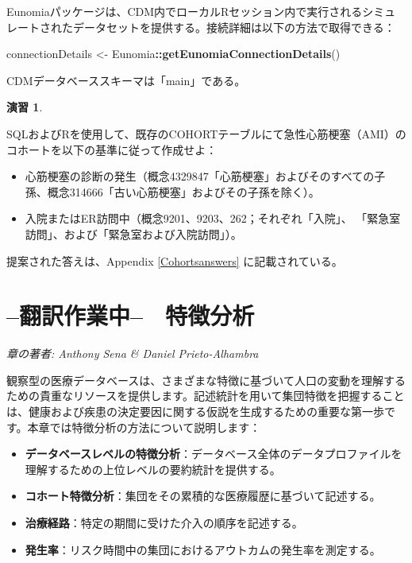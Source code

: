 \documentclass[
  11pt]{book}
\newenvironment{Shaded}{\begin{snugshade}}{\end{snugshade}}
\newcommand{\FunctionTok}[1]{\textcolor[rgb]{0.13,0.29,0.53}{\textbf{#1}}}
\newcommand{\NormalTok}[1]{#1}
\newcommand{\OtherTok}[1]{\textcolor[rgb]{0.56,0.35,0.01}{#1}}
\newcommand{\SpecialCharTok}[1]{\textcolor[rgb]{0.81,0.36,0.00}{\textbf{#1}}}
\providecommand{\tightlist}{%
  \setlength{\itemsep}{0pt}\setlength{\parskip}{0pt}}
\theoremstyle{definition}
\theoremstyle{definition}
\theoremstyle{definition}
\newtheorem{exercise}{演習}[chapter]
\theoremstyle{definition}
\theoremstyle{remark}
\begin{document}
Eunomiaパッケージは、CDM内でローカルRセッション内で実行されるシミュレートされたデータセットを提供する。接続詳細は以下の方法で取得できる：

\begin{Shaded}
\begin{Highlighting}[]
\NormalTok{connectionDetails }\OtherTok{\textless{}{-}}\NormalTok{ Eunomia}\SpecialCharTok{::}\FunctionTok{getEunomiaConnectionDetails}\NormalTok{()}
\end{Highlighting}
\end{Shaded}

CDMデータベーススキーマは「main」である。

\begin{exercise}
\protect\hypertarget{exr:exerciseCohortsSql}{}\label{exr:exerciseCohortsSql}

SQLおよびRを使用して、既存のCOHORTテーブルにて急性心筋梗塞（AMI）のコホートを以下の基準に従って作成せよ：

\begin{itemize}
\tightlist
\item
  心筋梗塞の診断の発生（概念4329847「心筋梗塞」およびそのすべての子孫、概念314666「古い心筋梗塞」およびその子孫を除く）。
\item
  入院またはER訪問中（概念9201、9203、262；それぞれ「入院」、 「緊急室訪問」、および「緊急室および入院訪問」）。
\end{itemize}

\end{exercise}

提案された答えは、Appendix \ref{Cohortsanswers} に記載されている。

\chapter{--翻訳作業中--　特徴分析}\label{Characterization}

\emph{章の著者: Anthony Sena \& Daniel Prieto-Alhambra}

観察型の医療データベースは、さまざまな特徴に基づいて人口の変動を理解するための貴重なリソースを提供します。記述統計を用いて集団特徴を把握することは、健康および疾患の決定要因に関する仮説を生成するための重要な第一歩です。本章では特徴分析の方法について説明します：

\begin{itemize}
\tightlist
\item
  \textbf{データベースレベルの特徴分析}：データベース全体のデータプロファイルを理解するための上位レベルの要約統計を提供する。
\item
  \textbf{コホート特徴分析}：集団をその累積的な医療履歴に基づいて記述する。
\item
  \textbf{治療経路}：特定の期間に受けた介入の順序を記述する。
\item
  \textbf{発生率}：リスク時間中の集団におけるアウトカムの発生率を測定する。
\end{itemize}
\end{document}
